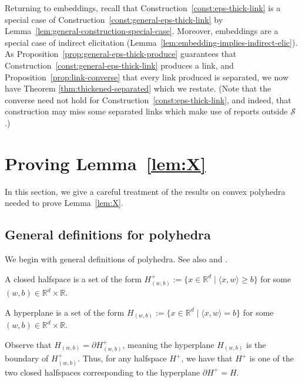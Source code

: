 \documentclass[twoside,11pt]{article}
\newcommand{\reals}{\mathbb{R}}
\newcommand{\Sc}{\mathcal{S}}
\newcommand{\inprod}[2]{\langle #1, #2 \rangle}%
\begin{document}
Returning to embeddings, recall that Construction~\ref{const:eps-thick-link} is a special case of Construction~\ref{const:general-eps-thick-link} by Lemma~\ref{lem:general-construction-special-case}.
Moreover, embeddings are a special case of indirect elicitation (Lemma~\ref{lem:embedding-implies-indirect-elic}).
As Proposition~\ref{prop:general-eps-thick-produce} guarantees that Construction~\ref{const:general-eps-thick-link} produces a link, and Proposition~\ref{prop:link-converse} that every link produced is separated, we now have
Theorem \ref{thm:thickened-separated} which we restate.
(Note that the converse need not hold for Construction~\ref{const:eps-thick-link}, and indeed, that construction may miss some separated links which make use of reports outside $\Sc$.)
\thickenedseparated*

\section{Proving Lemma~\ref{lem:X}}
\label{app:polyhedra}

In this section, we give a careful treatment of the results on convex polyhedra needed to prove Lemma~\ref{lem:X}.

\subsection{General definitions for polyhedra}
\label{app:polyhedra:defs}

We begin with general definitions of polyhedra.
See also \citet{ziegler1993lectures} and \citet{gallier2008notes}.


\begin{definition}
  A closed halfspace is a set of the form $H_{(w,b)}^+ := \{ x \in \reals^d \mid \inprod{x}{w} \geq b\}$ for some $(w,b) \in \reals^d \times \reals$.
\end{definition}
\begin{definition}[Hyperplane]
  A hyperplane is a set of the form $H_{(w,b)} := \{ x \in \reals^d \mid \inprod{x}{w} = b\}$ for some $(w,b)\in\reals^d \times \reals$.
\end{definition} 


Observe that $H_{(w,b)} = \partial H^+_{(w,b)}$, meaning the hyperplane $H_{(w,b)}$ is the boundary of $H^+_{(w,b)}$.
Thus, for any halfspace $H^+$, we have that $H^+$ is one of the two closed halfspaces corresponding to the hyperplane $\partial H^+ = H$.
\end{document}
